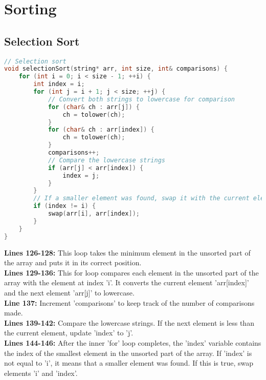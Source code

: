 \documentclass[letterpaper, 10pt,DIV=13]{scrartcl}
\numberwithin{equation}{section} %
\numberwithin{figure}{section} %
\numberwithin{table}{section} %
\begin{document}
\section{Sorting}
\subsection{Selection Sort}
\begin{linenumbers}
\begin{lstlisting}[language=C++, caption={Selection Sort}, label={code:example}]
// Selection sort 
void selectionSort(string* arr, int size, int& comparisons) {
    for (int i = 0; i < size - 1; ++i) {
        int index = i;
        for (int j = i + 1; j < size; ++j) {
            // Convert both strings to lowercase for comparison
            for (char& ch : arr[j]) {
                ch = tolower(ch);
            }
            for (char& ch : arr[index]) {
                ch = tolower(ch);
            }
            comparisons++;
            // Compare the lowercase strings
            if (arr[j] < arr[index]) {
                index = j;
            }
        }
        // If a smaller element was found, swap it with the current element
        if (index != i) {
            swap(arr[i], arr[index]);
        }
    }
}
\end{lstlisting}
\end{linenumbers}
\nolinenumbers

\textbf{Lines 126-128:} This loop takes the minimum element in the unsorted part of the array and puts it in its correct position. \\
\textbf{Lines 129-136:} This for loop compares each element in the unsorted part of the array with the element at index 'i'. It converts the current element 'arr[index]' and the next element 'arr[j]' to lowercase. \\
\textbf{Line 137:} Increment 'comparisons' to keep track of the number of comparisons made. \\
\textbf{Lines 139-142:} Compare the lowercase strings. If the next element is less than the current element, update 'index' to 'j'. \\
\textbf{Lines 144-146:} After the inner 'for' loop completes, the 'index' variable contains the index of the smallest element in the unsorted part of the array. If 'index' is not equal to 'i', it means that a smaller element was found. If this is true, swap elements 'i' and 'index'.
\end{document}
